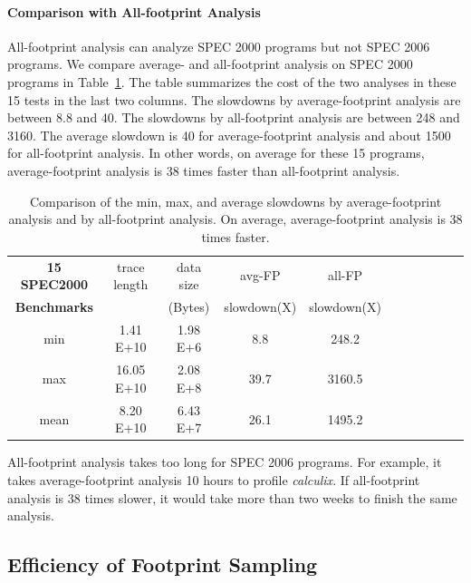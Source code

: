 \paragraph{Comparison with All-footprint Analysis}

All-footprint analysis can analyze SPEC 2000 programs but not SPEC
2006 programs.  We compare average- and all-footprint analysis on SPEC
2000 programs in Table~\ref{tbl:all-aver-compare}. The table summarizes the
cost of the two analyses in these 15 tests in the last two columns.  The slowdowns by
average-footprint analysis are between 8.8 and 40.  The slowdowns by
all-footprint analysis are between 248 and 3160.  The average slowdown
is 40 for average-footprint analysis and about 1500 for all-footprint
analysis.  In other words, on average for these 15 programs,
average-footprint analysis is 38 times faster than all-footprint
analysis.

\begin{table}[!h]
\small
\centering
\begin{tabular}{|c|c|c|c|c|c|c|c|c|c|c|}
\hline
{\bf 15 SPEC2000}       &trace length   &data size   &avg-FP &all-FP \\ 
{\bf Benchmarks}        &             &(Bytes)   &slowdown(X) &slowdown(X) \\ \hline \hline
min   & 1.41 E+10     & 1.98 E+6      & 8.8  & 248.2\\ \hline
max   & 16.05 E+10    & 2.08 E+8     & 39.7 & 3160.5\\ \hline
mean  & 8.20 E+10     & 6.43 E+7     & 26.1 & 1495.2\\ \hline 
\end{tabular}
\caption{Comparison of the min, max, and average slowdowns by average-footprint analysis and by all-footprint analysis.  On average, average-footprint analysis is 38 times faster.}
\label{tbl:all-aver-compare}
\end{table}

All-footprint analysis takes too long for SPEC 2006 programs.  For
example, it takes average-footprint analysis 10 hours to profile
\emph{calculix}.  If all-footprint analysis is 38 times slower, it
would take more than two weeks to finish the same analysis.


\subsection{Efficiency of Footprint Sampling}
\label{sec:samp-result}

